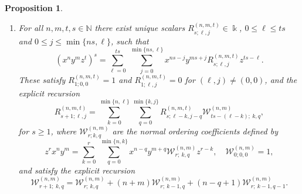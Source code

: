 \documentclass{amsart}
\newtheorem{proposition}[theorem]{Proposition}
\theoremstyle{definition}
\theoremstyle{remark}
\numberwithin{equation}{section}
\begin{document}
\begin{proposition}
\begin{enumerate}
\item [\rm (4)] For all $n,m,t,s\in\mathbb N$ there exist unique scalars $R^{(n,m,t)}_{s;\ell,j}\in\Bbbk$,
$0\le \ell\le ts$ and $0\le j\le \min\{ns,\ell\}$, such that
\begin{equation}\label{Rdefcase5iv}
(x^n y^m z^t)^s=\sum_{\ell=0}^{ts}\ \sum_{j=0}^{\min\{ns,\ell\}}x^{ns-j}y^{ms+j} R^{(n,m,t)}_{s;\ell,j} z^{ ts-\ell}.
\end{equation}
These satisfy $R^{(n,m,t)}_{1;0,0}=1$ and $R^{(n,m,t)}_{1;\ell,j}=0$ for $(\ell,j)\neq(0,0)$, and the explicit recursion
\begin{equation}\label{Rreccase5iv}
R^{(n,m,t)}_{s+1;\ell,j}=\sum_{k=0}^{\min\{n,\ell\}} \sum_{q=0}^{\min\{k,j\}}
R^{(n,m,t)}_{s;\ell-k, j-q} \mathcal W^{(n,m)}_{ ts-(\ell-k);\ k,q},
\end{equation}
for $s\ge 1$, where $\mathcal W^{(n,m)}_{r;k,q}$ are the normal ordering coefficients defined by
\begin{equation}\label{Wnmdefcase5iv}
z^{r}x^{n}y^{m}=\sum_{k=0}^{r}\ \sum_{q=0}^{\min\{n,k\}}x^{n-q}y^{m+q} \mathcal W^{(n,m)}_{r;\ k,q} z^{ r-k},\quad \mathcal W^{(n,m)}_{0;0,0}=1,
\end{equation}
and satisfy the explicit recursion
\begin{equation}\label{Wnmreccase5iv}
\mathcal W^{(n,m)}_{r+1;\ k,q}=\mathcal W^{(n,m)}_{r;\ k,q}+(n+m) \mathcal W^{(n,m)}_{r;\ k-1,q}+(n-q+1) \mathcal W^{(n,m)}_{r;\ k-1,q-1}.
\end{equation}


\end{enumerate}
\end{proposition}
\end{document}
